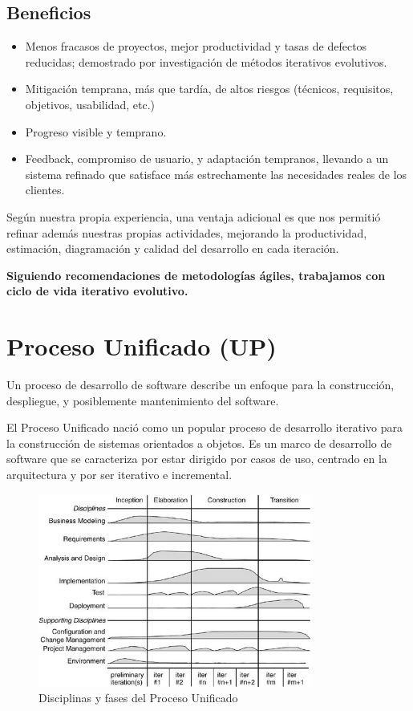 \subsection{Beneficios}
\begin{itemize}
    \item Menos fracasos de proyectos, mejor productividad y tasas de defectos reducidas; demostrado por investigación de métodos iterativos evolutivos.
    \item Mitigación temprana, más que tardía, de altos riesgos (técnicos, requisitos, objetivos, usabilidad, etc.)
    \item Progreso visible y temprano.
    \item Feedback, compromiso de usuario, y adaptación tempranos, llevando a un sistema refinado que satisface más estrechamente las necesidades reales de los clientes.
\end{itemize}

Según nuestra propia experiencia, una ventaja adicional es que nos permitió refinar además nuestras propias actividades, mejorando la productividad, estimación, diagramación y calidad del desarrollo en cada iteración.

\textbf{Siguiendo recomendaciones de metodologías ágiles, trabajamos con ciclo de vida iterativo evolutivo.}

\section{Proceso Unificado (UP)}

Un proceso de desarrollo de software describe un enfoque para la construcción, despliegue, y posiblemente mantenimiento del software.

El Proceso Unificado nació como un popular proceso de desarrollo iterativo para la construcción de sistemas orientados a objetos. Es un marco de desarrollo de software que se caracteriza por estar dirigido por casos de uso, centrado en la arquitectura y por ser iterativo e incremental.

\begin{figure}[htbp]
  \centering
    \includegraphics[width=0.8\textwidth]{imagenes/rup}
        \hfill
	\caption{Disciplinas y fases del Proceso Unificado}
	\label{fig:rup}
\end{figure}

